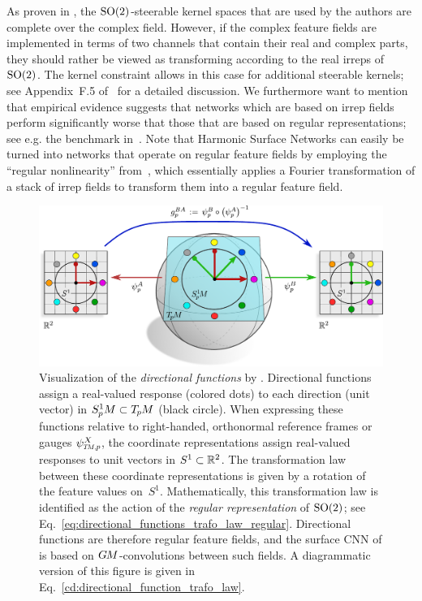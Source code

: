As proven in \cite{lang2020WignerEckart,Weiler2019_E2CNN}, the $\operatorname{SO}(2)$-steerable kernel spaces that are used by the authors are complete over the complex field.
However, if the complex feature fields are implemented in terms of two channels that contain their real and complex parts, they should rather be viewed as transforming according to the real irreps of~$\operatorname{SO}(2)$.
The kernel constraint allows in this case for additional steerable kernels; see Appendix~F.5 of~\cite{Weiler2019_E2CNN} for a detailed discussion.
We furthermore want to mention that empirical evidence suggests that networks which are based on irrep fields perform significantly worse that those that are based on regular representations; see e.g. the benchmark in~\cite{Weiler2019_E2CNN}.
Note that Harmonic Surface Networks can easily be turned into networks that operate on regular feature fields by employing the ``regular nonlinearity'' from~\cite{deHaan2020meshCNNs}, which essentially applies a Fourier transformation of a stack of irrep fields to transform them into a regular feature field.


\begin{figure}
    \centering
    \includegraphics[width=1.\textwidth]{figures/directional_function.pdf}
    \caption{\small
        Visualization of the \emph{directional functions} by \citet{poulenard2018multi}.
        Directional functions assign a real-valued response (colored dots) to each direction (unit vector) in $S^1_{\mkern-.5mu p}\mkern-.5muM \subset T_{\mkern-1.5mu p}\mkern-.5muM$ (black circle).
        When expressing these functions relative to right-handed, orthonormal reference frames or gauges $\psiTMp^X$, the coordinate representations assign real-valued responses to unit vectors in $S^1 \subset \mathbb{R}^2$.
        The transformation law between these coordinate representations is given by a rotation of the feature values on~$S^1$.
        Mathematically, this transformation law is identified as the action of the \emph{regular representation} of $\operatorname{SO}(2)$; see Eq.~\eqref{eq:directional_functions_trafo_law_regular}.
        Directional functions are therefore regular feature fields, and the surface CNN of \citet{poulenard2018multi} is based on $G\mkern-1.4muM$-convolutions between such fields.
        A diagrammatic version of this figure is given in Eq.~\eqref{cd:directional_function_trafo_law}.
    }
    \label{fig:directional_function}
\end{figure}


